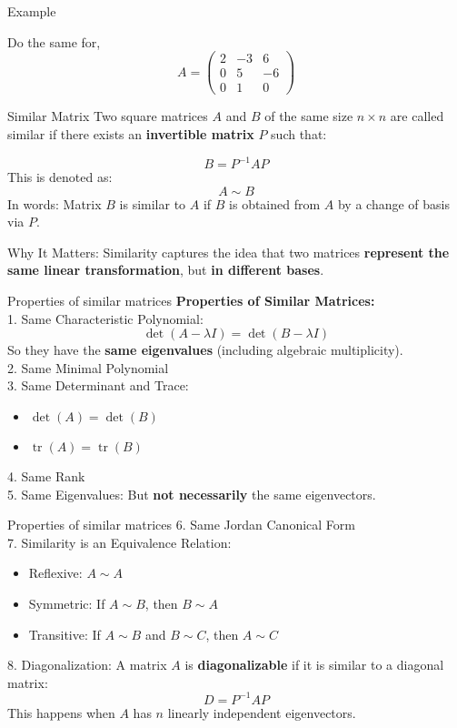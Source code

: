 \documentclass[11pt]{beamer}
\theoremstyle{plain}
\begin{document}
\begin{frame}{Example}
\begin{example}
    Do the same for, 
    $$A=\begin{pmatrix}
        2&-3&6\\
        0&5&-6\\
        0&1&0
    \end{pmatrix}$$
\end{example}
\end{frame}

\begin{frame}{Similar Matrix}
    Two square matrices $A$ and $B$ of the same size $n \times n$ are called similar if there exists an \textbf{invertible matrix} $P$ such that: 

$$
B = P^{-1} A P
$$
This is denoted as:
$$
A \sim B
$$
In words: Matrix $B$ is similar to $A$ if $B$ is obtained from $A$ by a change of basis via $P$.

Why It Matters: Similarity captures the idea that two matrices \textbf{represent the same linear transformation}, but \textbf{in different bases}.
\end{frame}

\begin{frame}{Properties of similar matrices}
\textbf{Properties of Similar Matrices:}\\
1. Same Characteristic Polynomial:
   $$
   \det(A - \lambda I) = \det(B - \lambda I)
   $$
   So they have the \textbf{same eigenvalues} (including algebraic multiplicity).\\
2. Same Minimal Polynomial\\
3. Same Determinant and Trace:
    \begin{itemize}
        \item $\det(A) = \det(B)$
        \item $\operatorname{tr}(A) = \operatorname{tr}(B)$
    \end{itemize}
4. Same Rank\\
5. Same Eigenvalues: But \textbf{not necessarily} the same eigenvectors.
\end{frame}

\begin{frame}{Properties of similar matrices}
    6. Same Jordan Canonical Form\\
7. Similarity is an Equivalence Relation:
    \begin{itemize}
        \item Reflexive: $A \sim A$
        \item Symmetric: If $A \sim B$, then $B \sim A$
        \item Transitive: If $A \sim B$ and $B \sim C$, then $A \sim C$
    \end{itemize}
8. Diagonalization:
   A matrix $A$ is \textbf{diagonalizable} if it is similar to a diagonal matrix:
     $$
     D = P^{-1} A P
     $$
     This happens when $A$ has $n$ linearly independent eigenvectors.
\end{frame}
\end{document}
